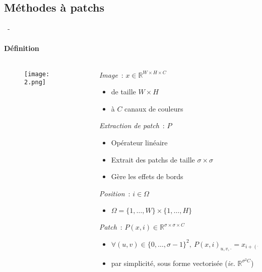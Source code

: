 \documentclass[aspectratio=169, 22pt]{beamer}
\begin{document}
\subsection{Méthodes à patchs}
\begin{frame}{\secname~- \subsecname}
  \framesubtitle{Définition}
  \begin{columns}
    \begin{column}{0.45\linewidth}
      \begin{figure}
        \centering
        \texttt{[image: 2.png]}
      \end{figure}
    \end{column}
    
    \begin{column}{0.55\linewidth}
      \emph{Image} : $x \in \mathbb{R}^{W \times H \times C}$
      \begin{itemize}
        \footnotesize 
      \item de taille $W \times H$
      \item à $C$ canaux de couleurs
      \end{itemize}
      
      \vfill
      \emph{Extraction de patch} : $P$
      \begin{itemize}
        \footnotesize 
      \item Opérateur linéaire
      \item Extrait des patchs de taille $\sigma \times \sigma$
      \item Gère les effets de bords
      \end{itemize}

      \vfill
      \emph{Position} : $i \in \Omega$
      \begin{itemize}
        \footnotesize 
      \item $\Omega = \{1,\dots,W\}\times\{1,\dots,H\}$
      \end{itemize}

      \vfill
      \emph{Patch} : $P(x,i) \in \mathbb{R}^{\sigma \times \sigma \times C}$
      \begin{itemize}
        \footnotesize 
        \item $\forall (u,v) \in \{0,\dots,\sigma-1\}^2,\ P(x,i)_{u, v, \cdot} =
          x_{i+(u,v)}$
        \item par simplicité, sous forme vectorisée (\emph{ie.} $\mathbb{R}^{\sigma^2 C}$)
      \end{itemize}      
    \end{column}
  \end{columns}  
\end{frame}
\end{document}
